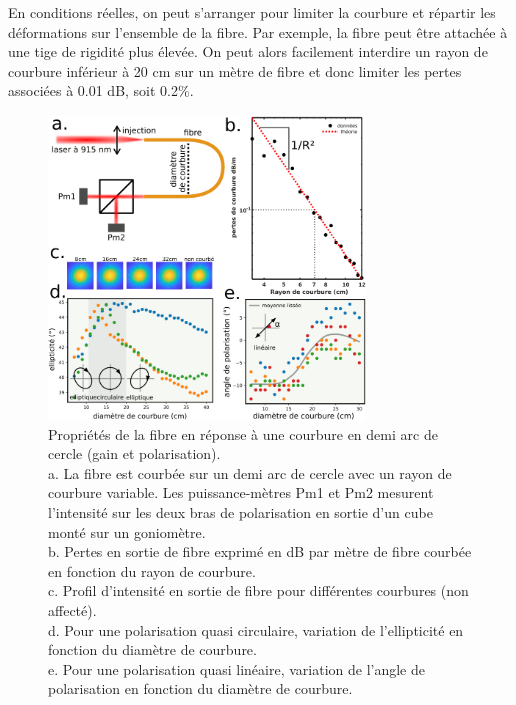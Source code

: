 En conditions réelles, on peut s'arranger pour limiter la courbure et répartir les déformations sur l'ensemble de la fibre. Par exemple, la fibre peut être attachée à une tige de rigidité plus élevée. On peut alors facilement interdire un rayon de courbure inférieur à 20 cm sur un mètre de fibre et donc limiter les pertes associées à 0.01 dB, soit 0.2\%.


\begin{figure}
    \centering
    \includegraphics[width=0.75\textwidth]{./files/fiber_bending.svg.png}
    \caption{Propriétés de la fibre en réponse à une courbure en demi arc de cercle (gain et polarisation).
    \\ a. La fibre est courbée sur un demi arc de cercle avec un rayon de courbure variable. Les puissance-mètres Pm1 et Pm2 mesurent l'intensité sur les deux bras de polarisation en sortie d'un cube monté sur un goniomètre. 
    \\ b. Pertes en sortie de fibre exprimé en dB par mètre de fibre courbée en fonction du rayon de courbure.
    \\ c. Profil d'intensité en sortie de fibre pour différentes courbures (non affecté).
    \\ d. Pour une polarisation quasi circulaire, variation de l'ellipticité en fonction du diamètre de courbure.
    \\ e. Pour une polarisation quasi linéaire, variation de l'angle de polarisation en fonction du diamètre de courbure.
    \label{FIGfibercarac}}
    \end{figure}

